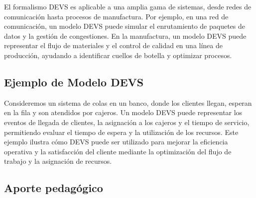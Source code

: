 \documentclass[12pt,twoside]{templates/unerthesis}
\begin{document}
El formalismo DEVS es aplicable a una amplia gama de sistemas, desde redes de comunicación hasta procesos de manufactura. Por ejemplo, en una red de comunicación, un modelo DEVS puede simular el enrutamiento de paquetes de datos y la gestión de congestiones. En la manufactura, un modelo DEVS puede representar el flujo de materiales y el control de calidad en una línea de producción, ayudando a identificar cuellos de botella y optimizar procesos.

\hypertarget{ejemplo-de-modelo-devs}{%
\subsection{Ejemplo de Modelo DEVS}\label{ejemplo-de-modelo-devs}}

Consideremos un sistema de colas en un banco, donde los clientes llegan, esperan en la fila y son atendidos por cajeros. Un modelo DEVS puede representar los eventos de llegada de clientes, la asignación a los cajeros y el tiempo de servicio, permitiendo evaluar el tiempo de espera y la utilización de los recursos. Este ejemplo ilustra cómo DEVS puede ser utilizado para mejorar la eficiencia operativa y la satisfacción del cliente mediante la optimización del flujo de trabajo y la asignación de recursos.

\hypertarget{aporte-pedaguxf3gico}{%
\subsection{Aporte pedagógico}\label{aporte-pedaguxf3gico}}
\end{document}
